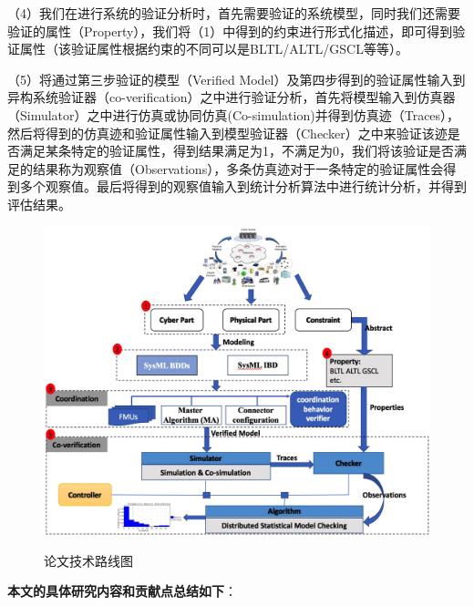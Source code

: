 （4）我们在进行系统的验证分析时，首先需要验证的系统模型，同时我们还需要验证的属性（Property），我们将（1）中得到的约束进行形式化描述，即可得到验证属性（该验证属性根据约束的不同可以是BLTL/ALTL/GSCL等等）。

（5）将通过第三步验证的模型（Verified Model）及第四步得到的验证属性输入到异构系统验证器（co-verification）之中进行验证分析，首先将模型输入到仿真器（Simulator）之中进行仿真或协同仿真(Co-simulation)并得到仿真迹（Traces），然后将得到的仿真迹和验证属性输入到模型验证器（Checker）之中来验证该迹是否满足某条特定的验证属性，得到结果满足为1，不满足为0，我们将该验证是否满足的结果称为观察值（Observations），多条仿真迹对于一条特定的验证属性会得到多个观察值。最后将得到的观察值输入到统计分析算法中进行统计分析，并得到评估结果。
\begin{figure}[htbp]
	\centering
	{\includegraphics[width=5.0in]{fig/1/paper-framework.jpg}}
	\caption{论文技术路线图}\label{pa-fra}
\end{figure}

\textbf{本文的具体研究内容和贡献点总结如下}：

